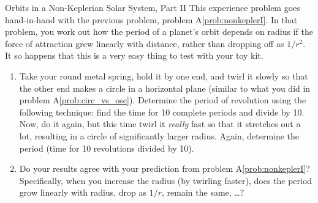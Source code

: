 \begin{aproblem}{Orbits in a Non-Keplerian Solar System, Part II }
  This experience problem goes hand-in-hand with the previous problem,
  problem A\ref{prob:nonkeplerI}.  In that problem, you work out how
  the period of a planet's orbit depends on radius if the force of
  attraction grew linearly with distance, rather than dropping off as
  $1/r^2$.  It so happens that this is a very easy thing to test with
  your toy kit.

  \begin{enumerate}
  \item Take your round metal spring, hold it by one end, and twirl it
    slowly so that the other end makes a circle in a horizontal plane
    (similar to what you did in problem A\ref{prob:circ_vs_osc}).
    Determine the period of revolution using the following technique:
    find the time for 10 complete periods and divide by 10.  Now, do
    it again, but this time twirl it {\em really} fast so that it
    stretches out a lot, resulting in a circle of significantly larger
    radius.  Again, determine the period (time for 10 revolutions
    divided by 10).

  \item Do your results agree with your prediction from problem
    A\ref{prob:nonkeplerI}?  Specifically, when you increase the
    radius (by twirling faster), does the period grow linearly with
    radius, drop as $1/r$, remain the same, \dots ?

  \end{enumerate}
\end{aproblem}



